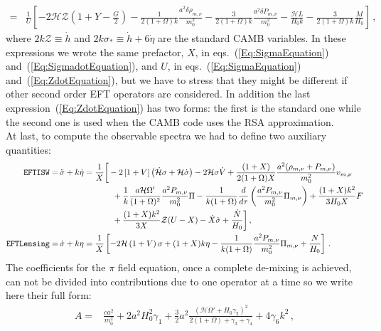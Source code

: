 \documentclass[prd,nofootinbib,showpacs]{revtex4}
\def\l{\left}
\def\r{\right}
\def\f{\frac}
\def\hub{{\mathcal H}}
\begin{document}
{\begin{align}
 =& \f{1}{U}\l[-2\hub\mathcal{Z}\l(1+Y-\f{G}{2}\r) -\f{1}{2(1+\Omega)k}\f{a^2\delta\rho_{m,\nu}}{m_0^2} -\f{3}{2(1+\Omega)k}\f{a^2\delta P_{m,\nu}}{m_0^2} -\f{\hub L}{H_0 k} -\f{3}{2(1+\Omega)k}\f{M}{H_0} \r] \label{Eq:ZdotEquation}\,,
\end{align}
%
where $2k\mathcal{Z}\equiv \dot{h}$ and $2k\sigma_*\equiv\dot{h}+6\dot{\eta}$ are the standard CAMB variables. 
In these expressions we wrote the same prefactor, $X$, in eqs.~(\ref{Eq:SigmaEquation}) and~(\ref{Eq:SigmadotEquation}), and $U$, in eqs.~(\ref{Eq:SigmaEquation}) and~(\ref{Eq:ZdotEquation}), but we have to stress that they might be different if other second order EFT operators are considered.
In addition the last expression~(\ref{Eq:ZdotEquation}) has two forms: the first is the standard one while the second one is used when the CAMB code uses the RSA approximation.\\
At last, to compute the observable spectra we had to define two auxiliary quantities:
%
\begin{align}
\texttt{EFTISW} =& \,\ddot{\sigma} + k\dot{\eta} = \f{1}{X}\bigg[ -2\l[1+V \r]\l(\dot{\mathcal{H}}\sigma +\hub \dot{\sigma} \r) -2\hub \sigma \dot{V} +\f{\l(1+X \r)}{2(1+\Omega)X}\frac{a^2(\rho_{m,\nu}+P_{m,\nu})}{m_0^2}v_{m,\nu}  \nonumber\\
	& \hspace{2.3cm} +\frac{1}{k}\frac{a \mathcal{H} \Omega^\prime}{(1+\Omega)^2}\frac{a^2P_{m,\nu}}{m_0^2}\Pi -\frac{1}{k(1+\Omega)}\frac{d}{d\tau}\left(\frac{a^2P_{m,\nu}}{m_0^2}\Pi_{m,\nu} \right) +\f{(1+X)k^2}{3 H_0 X}F  \nonumber \\
	& \hspace{2.3cm} +\f{(1+X)k^2}{3 X}\mathcal{Z}(U-X) -\dot{X}\dot{\sigma} +\f{\dot{N}}{H_0} \bigg] \label{Eq:TTSource}\,,\\
%
\texttt{EFTLensing} =& \,\dot{\sigma} + k\eta = \f{1}{X}\l[ -2\mathcal{H}\l(1 + V\r)\sigma +(1+ X) k \eta -\frac{1}{k (1+ \Omega)}\frac{a^2 P_{m,\nu}}{m_0^2} \Pi_{m,\nu} +\f{N}{H_0} \r] \label{Eq:LensingSource}\,.
\end{align}
%
The coefficients for the $\pi$ field equation, once a complete de-mixing is achieved, can not be divided into contributions due to one operator at a time so we write here their full form:
%
\begin{align}
%
A =& \f{c a^2}{m_0^2}+2 a^2 H_0^2 \gamma_1 +\f{3}{2}a^2 \f{\l(\hub \Omega' + H_0\gamma_2 \r)^2}{2(1+\Omega) + \gamma_3 +\gamma_4} + 4 \gamma_6 k^2 \,, \\
%
& \nonumber \\

\end{align}}
\end{document}
